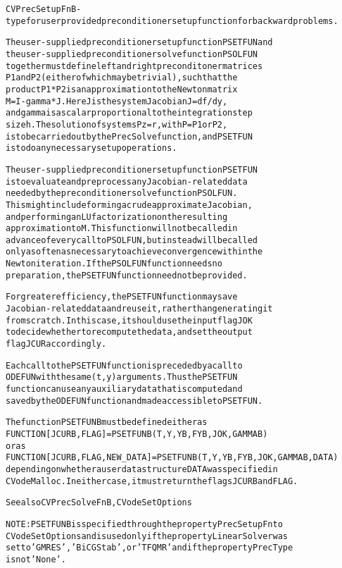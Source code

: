 \begin{alltt}
CVPrecSetupFnB - type for user provided preconditioner setup function for backward problems.

   The user-supplied preconditioner setup function PSETFUN and
   the user-supplied preconditioner solve function PSOLFUN
   together must define left and right preconditoner matrices
   P1 and P2 (either of which may be trivial), such that the
   product P1*P2 is an approximation to the Newton matrix
   M = I - gamma*J.  Here J is the system Jacobian J = df/dy,
   and gamma is a scalar proportional to the integration step
   size h.  The solution of systems P z = r, with P = P1 or P2,
   is to be carried out by the PrecSolve function, and PSETFUN
   is to do any necessary setup operations.

   The user-supplied preconditioner setup function PSETFUN
   is to evaluate and preprocess any Jacobian-related data
   needed by the preconditioner solve function PSOLFUN.
   This might include forming a crude approximate Jacobian,
   and performing an LU factorization on the resulting
   approximation to M.  This function will not be called in
   advance of every call to PSOLFUN, but instead will be called
   only as often as necessary to achieve convergence within the
   Newton iteration.  If the PSOLFUN function needs no
   preparation, the PSETFUN function need not be provided.

   For greater efficiency, the PSETFUN function may save
   Jacobian-related data and reuse it, rather than generating it
   from scratch.  In this case, it should use the input flag JOK
   to decide whether to recompute the data, and set the output
   flag JCUR accordingly.

   Each call to the PSETFUN function is preceded by a call to
   ODEFUN with the same (t,y) arguments.  Thus the PSETFUN
   function can use any auxiliary data that is computed and
   saved by the ODEFUN function and made accessible to PSETFUN.


   The function PSETFUNB must be defined either as
        FUNCTION [JCURB, FLAG] = PSETFUNB(T,Y,YB,FYB,JOK,GAMMAB)
   or as
        FUNCTION [JCURB, FLAG, NEW_DATA] = PSETFUNB(T,Y,YB,FYB,JOK,GAMMAB,DATA)
   depending on whether a user data structure DATA was specified in
   CVodeMalloc. In either case, it must return the flags JCURB and FLAG.

   See also CVPrecSolveFnB, CVodeSetOptions

   NOTE: PSETFUNB is specified through the property PrecSetupFn to
   CVodeSetOptions and is used only if the property LinearSolver was
   set to 'GMRES', 'BiCGStab', or 'TFQMR' and if the property PrecType
   is not 'None'.
\end{alltt}






\vspace{0.1in}
